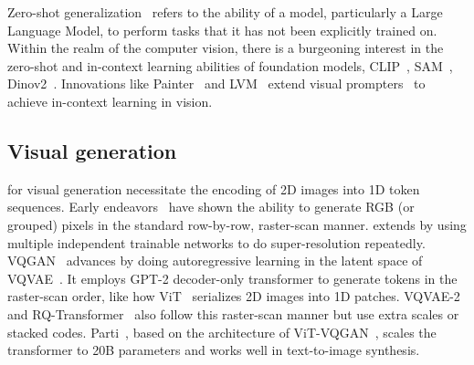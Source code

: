  Zero-shot generalization~\cite{multitask_zeroshot} refers to the ability of a model, particularly a Large Language Model, to perform tasks that it has not been explicitly trained on.
Within the realm of the computer vision, there is a burgeoning interest in the zero-shot and in-context learning abilities of foundation models, CLIP~\cite{clip}, SAM~\cite{sam}, Dinov2~\cite{dinov2}. Innovations like Painter~\cite{painter} and LVM~\cite{lvm} extend visual prompters~\cite{visualprompttuning1,visualprompttuning2} to achieve in-context learning in vision.


\vspace{-3pt}
\subsection{Visual generation}
\vspace{-3pt}
 for visual generation necessitate the encoding of 2D images into 1D token sequences.
Early endeavors~\cite{igpt,van2016pixelcnn} have shown the ability to generate RGB (or grouped) pixels in the standard row-by-row, raster-scan manner.
\cite{reed2017mspixelcnn} extends \cite{van2016pixelcnn} by using multiple independent trainable networks to do super-resolution repeatedly.
VQGAN~\cite{vqgan} advances \cite{igpt,van2016pixelcnn} by doing autoregressive learning in the latent space of VQVAE~\cite{vqvae}.
It employs GPT-2 decoder-only transformer to generate tokens in the raster-scan order, like how ViT~\cite{vit} serializes 2D images into 1D patches.
VQVAE-2~\cite{vqvae2} and RQ-Transformer~\cite{rq} also follow this raster-scan manner but use extra scales or stacked codes.
Parti~\cite{parti}, based on the architecture of ViT-VQGAN~\cite{vit-vqgan}, scales the transformer to 20B parameters and works well in text-to-image synthesis.

